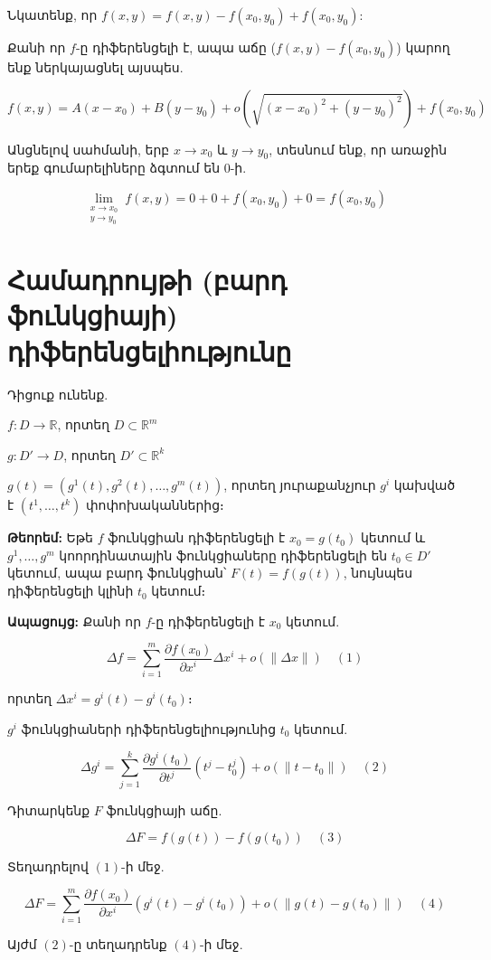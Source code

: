 \documentclass[12pt, a4paper]{article}
\begin{document}
Նկատենք, որ $f(x, y) = f(x, y) - f(x_0, y_0) + f(x_0, y_0)$:

Քանի որ $f$-ը դիֆերենցելի է, ապա աճը ($f(x, y) - f(x_0, y_0)$) կարող ենք ներկայացնել այսպես.

$$f(x, y) = A(x - x_0) + B(y - y_0) + o(\sqrt{(x-x_0)^2 + (y-y_0)^2}) + f(x_0, y_0)$$

Անցնելով սահմանի, երբ $x \to x_0$ և $y \to y_0$, տեսնում ենք, որ առաջին երեք գումարելիները ձգտում են $0$-ի.

$$\lim_{\substack{x \to x_0 \\ y \to y_0}} f(x, y) = 0 + 0 + f(x_0, y_0) + 0 = f(x_0, y_0)$$

\section{Համադրույթի (բարդ ֆունկցիայի) դիֆերենցելիությունը}

Դիցուք ունենք.

$f: D \to \mathbb{R}$, որտեղ $D \subset \mathbb{R}^m$

$g: D' \to D$, որտեղ $D' \subset \mathbb{R}^k$

$g(t) = (g^1(t), g^2(t), \dots, g^m(t))$, որտեղ յուրաքանչյուր $g^i$ կախված է $(t^1, \dots, t^k)$ փոփոխականներից։

\textbf{Թեորեմ:} Եթե $f$ ֆունկցիան դիֆերենցելի է $x_0 = g(t_0)$ կետում և $g^1, \dots, g^m$ կոորդինատային ֆունկցիաները դիֆերենցելի են $t_0 \in D'$ կետում, ապա բարդ ֆունկցիան՝ $F(t) = f(g(t))$, նույնպես դիֆերենցելի կլինի $t_0$ կետում։

\textbf{Ապացույց:}
Քանի որ $f$-ը դիֆերենցելի է $x_0$ կետում.

$$\Delta f = \sum_{i=1}^{m} \frac{\partial f(x_0)}{\partial x^i} \Delta x^i + o(\|\Delta x\|) \quad (1)$$

որտեղ $\Delta x^i = g^i(t) - g^i(t_0)$։

$g^i$ ֆունկցիաների դիֆերենցելիությունից $t_0$ կետում.

$$\Delta g^i = \sum_{j=1}^{k} \frac{\partial g^i(t_0)}{\partial t^j} (t^j - t_0^j) + o(\|t - t_0\|) \quad (2)$$

Դիտարկենք $F$ ֆունկցիայի աճը.

$$\Delta F = f(g(t)) - f(g(t_0)) \quad (3)$$

Տեղադրելով $(1)$-ի մեջ.

$$\Delta F = \sum_{i=1}^{m} \frac{\partial f(x_0)}{\partial x^i} (g^i(t) - g^i(t_0)) + o(\|g(t) - g(t_0)\|) \quad (4)$$

Այժմ $(2)$-ը տեղադրենք $(4)$-ի մեջ.
\end{document}
